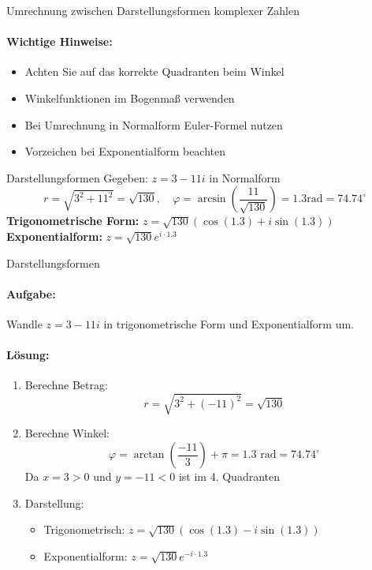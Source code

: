 \begin{KR}{Umrechnung zwischen Darstellungsformen komplexer Zahlen}
\paragraph{Wichtige Hinweise:}
\begin{itemize}
   \item Achten Sie auf das korrekte Quadranten beim Winkel
   \item Winkelfunktionen im Bogenmaß verwenden
   \item Bei Umrechnung in Normalform Euler-Formel nutzen
   \item Vorzeichen bei Exponentialform beachten
\end{itemize}
\end{KR}


\begin{example2}{Darstellungsformen}
Gegeben: $z = 3 - 11i$ in Normalform
$$r = \sqrt{3^2 + 11^2} = \sqrt{130}, \quad \varphi = \arcsin(\frac{11}{\sqrt{130}}) = 1.3 \text{rad} = 74.74^{\circ}$$
\textbf{Trigonometrische Form:} $z = \sqrt{130}(\cos(1.3) + i\sin(1.3))$
\vspace{2mm}\\
\textbf{Exponentialform:} $z = \sqrt{130}e^{i\cdot 1.3}$
\end{example2}

\begin{example2}{Darstellungsformen}
\paragraph{Aufgabe:} Wandle $z = 3 - 11i$ in trigonometrische Form und Exponentialform um.

\paragraph{Lösung:}
\begin{enumerate}
    \item Berechne Betrag:
    $$r = \sqrt{3^2 + (-11)^2} = \sqrt{130}$$
    
    \item Berechne Winkel:
    $$\varphi = \arctan\left(\frac{-11}{3}\right) + \pi = 1.3 \text{ rad} = 74.74^{\circ}$$
    Da $x=3 > 0$ und $y=-11 < 0$ ist im 4. Quadranten
    
    \item Darstellung:
    \begin{itemize}
        \item Trigonometrisch: $z = \sqrt{130}(\cos(1.3) - i\sin(1.3))$
        \item Exponentialform: $z = \sqrt{130}e^{-i\cdot 1.3}$
    \end{itemize}
\end{enumerate}
\end{example2}


